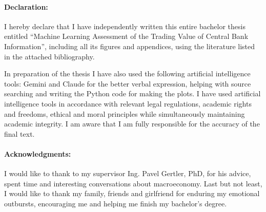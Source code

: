 \documentclass[12pt, oneside]{book}  %
\def\mfnazov{Machine Learning Assessment of the Trading Value of Central Bank Information}
\begin{document}




\newpage
\pagestyle{plain}
\paragraph{Declaration:}
I hereby declare that I have independently written this entire bachelor thesis entitled ``\mfnazov'', including all its figures and appendices, using the literature listed in the attached bibliography.

In preparation of the thesis I have also used the following artificial intelligence tools: Gemini and Claude for the better verbal expression, helping with source searching and writing the Python code for making the plots. I have used artificial intelligence tools in accordance with relevant legal regulations, academic rights and freedoms, ethical and moral principles while simultaneously maintaining academic integrity. I am aware that I am fully responsible for the accuracy of the final text.

\paragraph{Acknowledgments:}
I would like to thank to my supervisor Ing. Pavel Gertler, PhD, for his advice, spent time and interesting conversations about macroeconomy. Last but not least, I would like to thank my family, friends and girlfriend for enduring my emotional outbursts, encouraging me and helping me finish my bachelor's degree.


\newpage 



%
%
%
%
\end{document}

